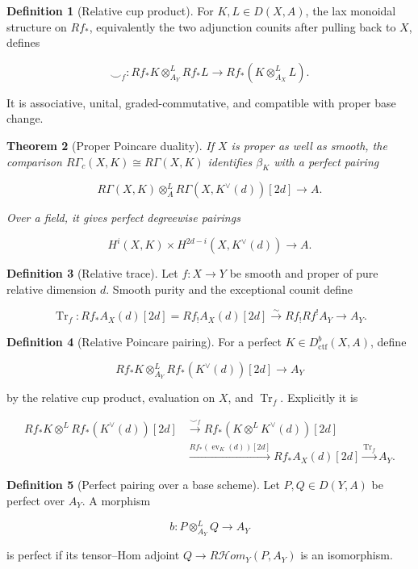 \documentclass[10pt]{article}
\newtheorem{theorem}{Theorem}[section]
\theoremstyle{definition}
\newtheorem{definition}[theorem]{Definition}
\newcommand{\Dctf}{D^b_{\mathrm{ctf}}}
\newcommand{\RHom}{R\mathcal Hom}
\newcommand{\RG}{R\Gamma}
\newcommand{\RGc}{R\Gamma_c}
\newcommand{\Tr}{\operatorname{Tr}}
\begin{document}
\begin{definition}[Relative cup product]
For \(K,L\in D(X,A)\), the lax monoidal structure on \(Rf_*\), equivalently
the two adjunction counits after pulling back to \(X\), defines

\[
 \smile_f:Rf_*K\otimes^L_{A_Y}Rf_*L
 \longrightarrow Rf_*(K\otimes^L_{A_X}L).
\]

It is associative, unital, graded-commutative, and compatible with proper
base change.
\end{definition}

\begin{theorem}[Proper Poincare duality]
If \(X\) is proper as well as smooth, the comparison
\(\RGc(X,K)\cong\RG(X,K)\) identifies \(\beta_K\) with a perfect pairing

\[
 \RG(X,K)\otimes_A^L\RG(X,K^\vee(d))[2d]\longrightarrow A.
\]

Over a field, it gives perfect degreewise pairings

\[
 H^i(X,K)\times H^{2d-i}(X,K^\vee(d))\longrightarrow A.
\]
\end{theorem}

\begin{definition}[Relative trace]
Let \(f:X\to Y\) be smooth and proper of pure relative dimension \(d\).
Smooth purity and the exceptional counit define

\[
 \Tr_f:
 Rf_*A_X(d)[2d]=Rf_!A_X(d)[2d]
 \xrightarrow{\sim}Rf_!Rf^!A_Y\longrightarrow A_Y.
\]
\end{definition}

\begin{definition}[Relative Poincare pairing]
For a perfect \(K\in\Dctf(X,A)\), define

\[
 Rf_*K\otimes^L_{A_Y}Rf_*(K^\vee(d))[2d]
 \longrightarrow A_Y
\]

by the relative cup product, evaluation on \(X\), and \(\Tr_f\).
Explicitly it is

\[
\begin{aligned}
Rf_*K\otimes^LRf_*(K^\vee(d))[2d]
&\xrightarrow{\smile_f}
Rf_*(K\otimes^LK^\vee(d))[2d]\\
&\xrightarrow{Rf_*(\operatorname{ev}_K(d))[2d]}
Rf_*A_X(d)[2d]
\xrightarrow{\Tr_f}A_Y.
\end{aligned}
\]
\end{definition}

\begin{definition}[Perfect pairing over a base scheme]
Let \(P,Q\in D(Y,A)\) be perfect over \(A_Y\).  A morphism

\[
 b:P\otimes^L_{A_Y}Q\longrightarrow A_Y
\]

is perfect if its tensor--Hom adjoint
\(Q\to\RHom_Y(P,A_Y)\) is an isomorphism.
\end{definition}
\end{document}
